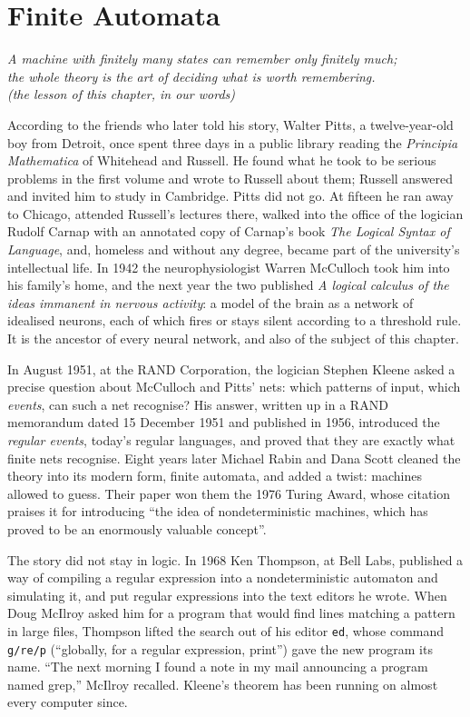 \chapter{Finite Automata}\label{ch:automata}

\begin{center}\itshape
A machine with finitely many states can remember only finitely much;\\
the whole theory is the art of deciding what is worth remembering.\\
\upshape(the lesson of this chapter, in our words)
\end{center}

According to the friends who later told his story, Walter Pitts, a twelve-year-old boy from Detroit, once spent three days in a public library reading the \emph{Principia Mathematica} of Whitehead and Russell. He found what he took to be serious problems in the first volume and wrote to Russell about them; Russell answered and invited him to study in Cambridge. Pitts did not go. At fifteen he ran away to Chicago, attended Russell's lectures there, walked into the office of the logician Rudolf Carnap with an annotated copy of Carnap's book \emph{The Logical Syntax of Language}, and, homeless and without any degree, became part of the university's intellectual life. In 1942 the neurophysiologist Warren McCulloch took him into his family's home, and the next year the two published \emph{A logical calculus of the ideas immanent in nervous activity}: a model of the brain as a network of idealised neurons, each of which fires or stays silent according to a threshold rule. It is the ancestor of every neural network, and also of the subject of this chapter.

In August 1951, at the RAND Corporation, the logician Stephen Kleene asked a precise question about McCulloch and Pitts' nets: which patterns of input, which \emph{events}, can such a net recognise? His answer, written up in a RAND memorandum dated 15 December 1951 and published in 1956, introduced the \emph{regular events}, today's regular languages, and proved that they are exactly what finite nets recognise. Eight years later Michael Rabin and Dana Scott cleaned the theory into its modern form, finite automata, and added a twist: machines allowed to guess. Their paper won them the 1976 Turing Award, whose citation praises it for introducing ``the idea of nondeterministic machines, which has proved to be an enormously valuable concept''.

The story did not stay in logic. In 1968 Ken Thompson, at Bell Labs, published a way of compiling a regular expression into a nondeterministic automaton and simulating it, and put regular expressions into the text editors he wrote. When Doug McIlroy asked him for a program that would find lines matching a pattern in large files, Thompson lifted the search out of his editor \texttt{ed}, whose command \texttt{g/re/p} (``globally, for a regular expression, print'') gave the new program its name. ``The next morning I found a note in my mail announcing a program named grep,'' McIlroy recalled. Kleene's theorem has been running on almost every computer since.

